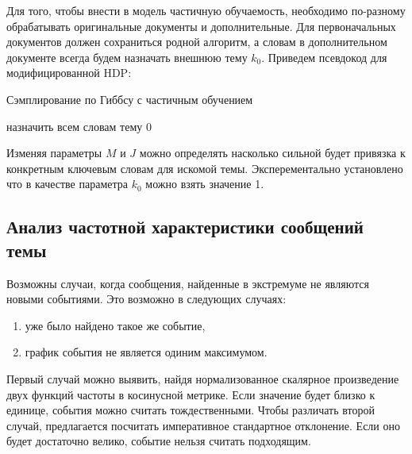\documentclass[12pt, a4paper]{article}
\begin{document}
  Для того, чтобы внести в модель частичную обучаемость, необходимо по-разному обрабатывать оригинальные документы и дополнительные. Для первоначальных документов должен сохраниться родной алгоритм, а словам в дополнительном документе всегда будем назначать внешнюю тему $k_0$. Приведем псевдокод для модифицированной HDP:
  
  \begin{algorithm}[H]
  	\caption{Сэмплирование по Гиббсу с частичным обучением}
    \SetAlgoLined
  	назначить всем словам тему $0$\;
  \end{algorithm}
  
  Изменяя параметры $M$ и $J$ можно определять насколько сильной будет привязка к конкретным ключевым словам для искомой темы. Эксперементально установлено что в качестве параметра $k_0$ можно взять значение 1.
  
  \subsection{Анализ частотной характеристики сообщений темы}
  Возможны случаи, когда сообщения, найденные в экстремуме не являются новыми событиями. Это возможно в следующих случаях:
  \begin{enumerate}
  \item уже было найдено такое же событие,
  \item график события не является одиним максимумом.
  \end{enumerate}
  Первый случай можно выявить, найдя нормализованное скалярное произведение двух функций частоты в косинусной метрике. Если значение будет близко к единице, события можно считать тождественными. Чтобы различать второй случай, предлагается посчитать императивное стандартное отклонение. Если оно будет достаточно велико, событие нельзя считать подходящим.
  
\end{document}
